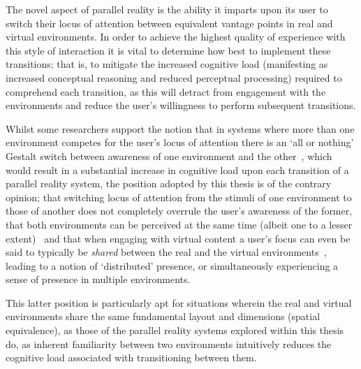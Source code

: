 The novel aspect of parallel reality is the ability it imparts upon its user to switch their locus of attention between equivalent vantage points in real and virtual environments. In order to achieve the highest quality of experience with this style of interaction it is vital to determine how best to implement these transitions; that is, to mitigate the increased cognitive load (manifesting as increased conceptual reasoning and reduced perceptual processing) required to comprehend each transition, as this will detract from engagement with the environments and reduce the user's willingness to perform subsequent transitions.



Whilst some researchers support the notion that in systems where more than one environment competes for the user's locus of attention there is an `all or nothing' Gestalt switch between awareness of one environment and the other~\cite{Slater2002}, which would result in a substantial increase in cognitive load upon each transition of a parallel reality system, the position adopted by this thesis is of the contrary opinion; that switching locus of attention from the stimuli of one environment to those of another does not completely overrule the user's awareness of the former, that both environments can be perceived at the same time (albeit one to a lesser extent)~\cite{Ijsselsteijn2001} and that when engaging with virtual content a user's focus can even be said to typically be \textit{shared} between the real and the virtual environments~\cite{Waterworth2001}, leading to a notion of `distributed' presence, or simultaneously experiencing a sense of presence in multiple environments.

This latter position is particularly apt for situations wherein the real and virtual environments share the same fundamental layout and dimensions (spatial equivalence), as those of the parallel reality systems explored within this thesis do, as inherent familiarity between two environments intuitively reduces the cognitive load associated with transitioning between them.

